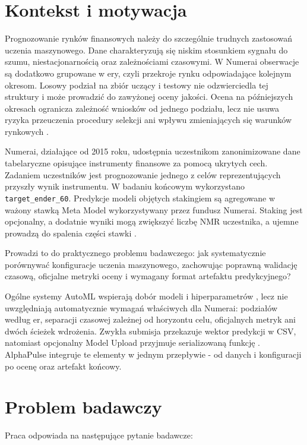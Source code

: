 \documentclass[12pt,a4paper]{report}
\newcommand{\sourcecite}[1]{\autocite{#1}}
\begin{document}
\section{Kontekst i motywacja}
Prognozowanie rynków finansowych należy do szczególnie trudnych zastosowań uczenia
maszynowego. Dane charakteryzują się niskim stosunkiem sygnału do szumu,
niestacjonarnością oraz zależnościami czasowymi. W Numerai obserwacje są dodatkowo
grupowane w ery, czyli przekroje rynku odpowiadające kolejnym okresom. Losowy podział
na zbiór uczący i testowy nie odzwierciedla tej struktury i może prowadzić do
zawyżonej oceny jakości. Ocena na późniejszych okresach ogranicza zależność wniosków
od jednego podziału, lecz nie usuwa ryzyka przeuczenia procedury selekcji ani wpływu
zmieniających się warunków rynkowych \sourcecite{bailey-backtest,cawley-talbot}.

Numerai, działające od 2015 roku, udostępnia uczestnikom zanonimizowane dane
tabelaryczne opisujące instrumenty finansowe za pomocą ukrytych cech. Zadaniem
uczestników jest prognozowanie jednego z celów reprezentujących przyszły wynik
instrumentu. W badaniu końcowym wykorzystano \texttt{target\_ender\_60}. Predykcje
modeli objętych stakingiem są agregowane w ważony stawką Meta Model wykorzystywany
przez fundusz Numerai. Staking jest opcjonalny, a dodatnie wyniki mogą zwiększyć liczbę
NMR uczestnika, a ujemne prowadzą do spalenia części stawki \sourcecite{numerai-staking}.

Prowadzi to do praktycznego problemu badawczego: jak systematycznie porównywać
konfiguracje uczenia maszynowego, zachowując poprawną walidację czasową, oficjalne
metryki oceny i wymagany format artefaktu predykcyjnego?

Ogólne systemy AutoML wspierają dobór modeli i hiperparametrów
\sourcecite{automl-survey}, lecz nie uwzględniają automatycznie wymagań właściwych
dla Numerai: podziałów według er, separacji czasowej zależnej od horyzontu celu,
oficjalnych metryk ani dwóch ścieżek wdrożenia. Zwykła submisja przekazuje wektor
predykcji w CSV, natomiast opcjonalny Model Upload przyjmuje serializowaną funkcję
 \sourcecite{numerai-submissions,numerai-model-upload}.
AlphaPulse integruje te elementy w jednym
przepływie - od danych i konfiguracji po ocenę oraz artefakt końcowy.

\section{Problem badawczy}
Praca odpowiada na następujące pytanie badawcze:
\end{document}
